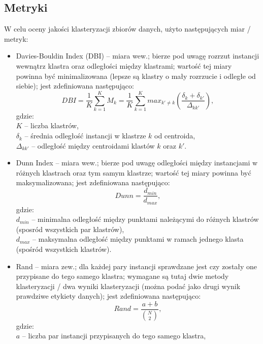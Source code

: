   \subsection{Metryki}
    W celu oceny jakości klasteryzacji zbiorów danych, użyto następujących miar / metryk:
    \begin{itemize}
      \item{Davies-Bouldin Index (DBI) -- miara wew.; bierze pod uwagę rozrzut instancji wewnątrz klastra oraz odległości między klastrami; 
                                          wartość tej miary powinna być minimalizowana (lepsze są klastry o mały rozrzucie i odległe od siebie); 
                                          jest zdefiniowana następująco:
                                          $$ DBI = \frac{1}{K} \sum_{k = 1}^{K} M_k = \frac{1}{K} \sum_{k = 1}^{K} max_{k' \neq k} (\frac{\delta_k + \delta_{k'}}{\Delta_{kk'}}),$$
                                          gdzie:\\
                                          $K$ -- liczba klastrów,\\
                                          $\delta_k$ -- średnia odległość instancji w klastrze $k$ od centroida,\\
                                          $\Delta_{kk'}$ -- odległość między centroidami klastów $k$ oraz $k'$.}
      \item{Dunn Index -- miara wew.; bierze pod uwagę odległości między instancjami w różnych klastrach oraz tym samym klastrze;
                          wartość tej miary powinna być maksymalizowana; jest zdefiniowana następująco:
                          $$ Dunn = \frac{d_{min}}{d_{max}},$$
                          gdzie:\\
                          $d_{min}$ -- minimalna odległość między punktami należącymi do różnych klastrów (sposród wszystkich par klastrów),\\
                          $d_{max}$ -- maksymalna odległość między punktami w ramach jednego klasta (spośród wszystkich klastrów).}
      \item{Rand -- miara zew.; dla każdej pary instancji sprawdzane jest czy zostały one przypisane do tego samego klastra; wymagane są tutaj dwie
                    metody klasteryzacji / dwa wyniki klasteryzacji (można podać jako drugi wynik prawdziwe etykiety danych); jest zdefiniowana następująco:
                    $$ Rand = \frac{a + b}{\binom{N}{2}},$$
                    gdzie:\\
                    $a$ -- liczba par instancji przypisanych do tego samego klastra,\\
}
\end{itemize}
